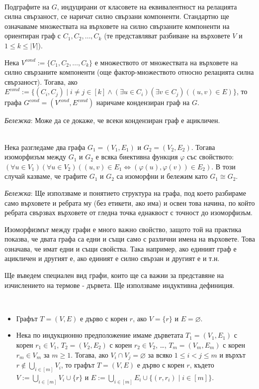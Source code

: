 \documentclass[12pt,twoside,a4paper]{article}
\begin{document}
	\begin{definition}~\\
		\indent Подграфите на $G$, индуцирани от класовете на еквивалентност на релацията силна свързаност, се наричат силно свързани компоненти. Стандартно ще означаваме множествата на върховете на силно свързаните компоненти на ориентиран граф с $C_1, C_2, \dots, C_k$ (те представляват разбиване на върховете $V$ и $1 \le k \le |V|$).
		
		Нека $V^{cond} := \{C_1, C_2, \dots, C_k\}$ е множеството от множествата на върховете на силно свързаните компоненти (още фактор-множеството относно релацията силна свързаност). Тогава, ако $E^{cond} := \{(C_i, C_j) \mid i \neq j \in [k] \land (\exists u \in C_i)(\exists v \in C_j)((u,v) \in E)\}$, то графа $G^{cond}=(V^{cond},E^{cond})$ наричаме кондензиран граф на $G$.
		
		\textit{Бележка}: Може да се докаже, че всеки кондензиран граф е ацикличен.
	\end{definition}
	
	\begin{definition}~\\
		\indent Нека разгледаме два графа $G_1=(V_1,E_1)$ и $G_2=(V_2,E_2)$. Тогава изоморфизъм между $G_1$ и $G_2$ е всяка биективна функция $\varphi$ със свойството: $(\forall u \in V_1)(\forall u \in V_2)((u,v) \in E_1 \iff (\varphi(u),\varphi(v)) \in E_2)$. В този случай казваме, че графите $G_1$ и $G_2$ са изоморфни и бележим като $G_1 \cong G_2$.
		
		\textit{Бележка}: Ще използваме и понятието структура на графа, под което разбираме само върховете и ребрата му (без етикети, ако има) и освен това начина, по който ребрата свързвах върховете от гледна точка еднаквост с точност до изоморфизъм.
	\end{definition}
	
	Изоморфизмът между графи е много важно свойство, защото той на практика показва, че двата графа са едни и същи само с различни имена на върховете. Това означава, че имат едни и същи свойства. Така например, ако единият граф е ацикличен и другият е, ако единият е силно свързан и другият е и т.н.
	
	Ще въведем специален вид графи, които ще са важни за представяне на изчислението на термове - дървета. Ще използваме индуктивна дефиниция. \begin{definition}~
		\begin{itemize}
			\item Графът $T=(V,E)$ е дърво с корен $r$, ако $V=\{r\}$ и $E=\varnothing$.
			\item Нека по индукционно предположение имаме дърветата $T_1=(V_1,E_1)$ с корен $r_1 \in V_1$, $T_2=(V_2,E_2)$ с корен $r_2 \in V_2$, \dots, $T_m=(V_m, E_m)$ с корен $r_m \in V_m$ за $m \ge 1$. Тогава, ако $V_i \cap V_j = \varnothing$ за всяко $1 \le i < j \le m$ и върхът $r \notin \bigcup_{i \in [m]}V_i$, то графът $T = (V,E)$ е дърво с корен $r$, където $V := \bigcup_{i \in [m]}V_i \cup \{r\}$ и $E := \bigcup_{i \in [m]}E_i \cup \{(r, r_i) \mid i \in [m]\}$.
		\end{itemize}
	\end{definition}
	
\end{document}
